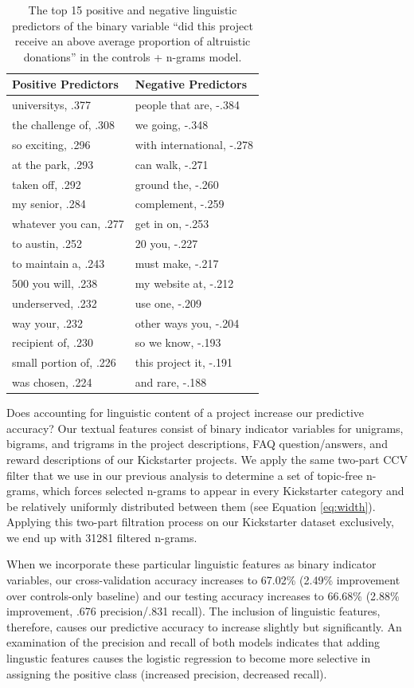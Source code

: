 \documentclass[letterpaper]{article}
\begin{document}
\begin{table}[t]
\centering
\begin{tabular}{|l|l|}
\hline
Positive Predictors & Negative Predictors \\
\hline
universitys, .377 & people that are, -.384 \\
the challenge of, .308 & we going, -.348\\
so exciting, .296 & with international, -.278\\
at the park, .293 & can walk, -.271\\
taken off, .292 & ground the, -.260\\
my senior, .284 & complement, -.259\\
whatever you can, .277 & get in on, -.253\\
to austin, .252 & 20 you, -.227\\
to maintain a, .243 & must make, -.217\\
500 you will, .238 & my website at, -.212\\
underserved, .232 & use one, -.209 \\
way your, .232 & other ways you, -.204\\
recipient of, .230 & so we know, -.193\\
small portion of, .226 & this project it, -.191\\
was chosen, .224 & and rare, -.188\\
\hline
\end{tabular}
\caption{The top 15 positive and negative linguistic predictors of the binary variable ``did this project receive an above average proportion of altruistic donations'' in the controls + n-grams model.}
\label{tab:regression}
\end{table}

Does accounting for linguistic content of a project increase our predictive accuracy? Our textual features consist of binary indicator variables for unigrams, bigrams, and trigrams in the project descriptions, FAQ question/answers, and reward descriptions of our Kickstarter projects. We apply the same two-part CCV filter that we use in our previous analysis to determine a set of topic-free n-grams, which forces selected n-grams to appear in every Kickstarter category and be relatively uniformly distributed between them (see Equation \ref{eq:width}). Applying this two-part filtration process on our Kickstarter dataset exclusively, we end up with 31281 filtered n-grams.

When we incorporate these particular linguistic features as binary indicator variables, our cross-validation accuracy increases to 67.02\% (2.49\% improvement over controls-only baseline) and our testing accuracy increases to 66.68\% (2.88\% improvement, .676 precision/.831 recall). The inclusion of linguistic features, therefore, causes our predictive accuracy to increase slightly but significantly. An examination of the precision and recall of both models indicates that adding lingustic features causes the logistic regression to become more selective in assigning the positive class (increased precision, decreased recall).
\end{document}
